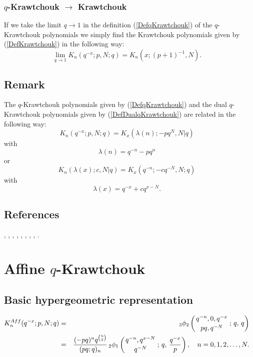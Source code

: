 \documentclass[envcountchap,graybox]{svmono}
\newcommand{\qhyp}[5]{\mbox{}_{#1}{\phi}_{#2}
\left(\genfrac{}{}{0pt}{}{#3}{#4}\,;\,q,\,#5\right)}
\newcommand{\qhyp}[5]{\,\mbox{}_{#1}\phi_{#2}\!\left(
  \genfrac{}{}{0pt}{}{#3}{#4};#5\right)}
\begin{document}
\subsubsection*{$q$-Krawtchouk $\rightarrow$ Krawtchouk}
If we take the limit $q\rightarrow 1$ in the definition (\ref{DefqKrawtchouk}) of the $q$-Krawtchouk
polynomials we simply find the Krawtchouk polynomials given by (\ref{DefKrawtchouk}) in the
following way:
\begin{equation}
\lim_{q\rightarrow 1}K_n(q^{-x};p,N;q)=K_n(x;(p+1)^{-1},N).
\end{equation}

\subsection*{Remark}
The $q$-Krawtchouk polynomials given by (\ref{DefqKrawtchouk}) and the
dual $q$-Krawtchouk polynomials given by (\ref{DefDualqKrawtchouk}) are
related in the following way:
$$K_n(q^{-x};p,N;q)=K_x(\lambda(n);-pq^N,N|q)$$
with
$$\lambda(n)=q^{-n}-pq^n$$
or
$$K_n(\lambda(x);c,N|q)=K_x(q^{-n};-cq^{-N},N;q)$$
with
$$\lambda(x)=q^{-x}+cq^{x-N}.$$

\subsection*{References}
\cite{AlvarezRonveaux}, \cite{AskeyWilson79}, \cite{AtakRahmanSuslov},
\cite{Campigotto+}, \cite{GasperRahman90}, \cite{Nikiforov+},
\cite{NoumiMimachi91}, \cite{Stanton80III}, \cite{Stanton84}.


\newpage

\section{Affine $q$-Krawtchouk}
\par\setcounter{equation}{0}

\subsection*{Basic hypergeometric representation}
\begin{eqnarray}
\label{DefAffqKrawtchouk}
K_n^{Aff}(q^{-x};p,N;q)&=&\qhyp{3}{2}{q^{-n},0,q^{-x}}{pq,q^{-N}}{q}\\
&=&\frac{(-pq)^nq^{\binom{n}{2}}}{(pq;q)_n}\,
\qhyp{2}{1}{q^{-n},q^{x-N}}{q^{-N}}{\frac{q^{-x}}{p}},\quad n=0,1,2,\ldots,N.\nonumber
\end{eqnarray}
\end{document}
